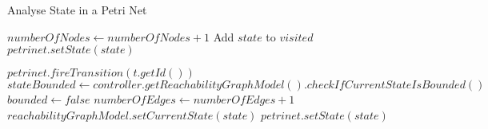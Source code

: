 \begin{algorithm}
\caption{Analyse State in a Petri Net}
\begin{algorithmic}

        \State \Return
    \EndIf
    \State $numberOfNodes \gets numberOfNodes + 1$
    \State Add $state$ to $visited$
    \State $petrinet.setState(state)$

        \State $petrinet.fireTransition(t.getId())$
        \State $stateBounded \gets controller.getReachabilityGraphModel().checkIfCurrentStateIsBounded()$
            \State $bounded \gets false$
            \State \Return
        \EndIf
        \State $numberOfEdges \gets numberOfEdges + 1$
        \State {}
        \State $reachabilityGraphModel.setCurrentState(state)$
        \State $petrinet.setState(state)$
    \EndFor
\EndFunction

\end{algorithmic}
\end{algorithm}


